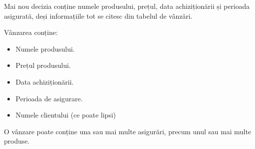 Mai nou decizia conține numele produsului, prețul, data achiziționării și perioada asigurată, deși informațiile tot se citesc din tabelul de vânzări.

Vânzarea conține:
\begin{itemize}
	\item Numele produsului.
	\item Prețul produsului.
	\item Data achiziționării.
	\item Perioada de asigurare.
	\item Numele clientului (ce poate lipsi)
\end{itemize}
O vânzare poate conține una sau mai multe asigurări, precum unul sau mai multe produse.



